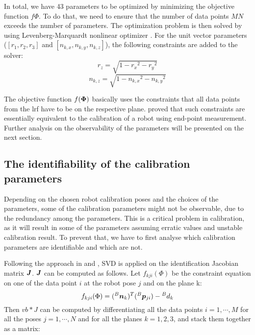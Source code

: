 In total, we have 43 parameters to be optimized by minimizing the objective function $f{\Phi}$. To do that, we need to ensure that the number of data points $MN$ exceeds the number of parameters. The optimization problem is then solved by using Levenberg-Marquardt nonlinear optimizer \cite{Newville2014}. For the unit vector parameters ($[r_1, r_2, r_3]$ and  $[n_{k,x}, n_{k,y}, n_{k,z}]$), the following constraints are added to the solver:
\begin{equation}
\label{eq:10}
{r_z} = \sqrt{1 - {r_x}^2 - {r_y}^2}
\end{equation}
\begin{equation}
\label{eq:11}
n_{k,z} = \sqrt{1 - {n_{k,x}}^2 - {n_{k,y}}^2}
\end{equation}


The objective function $f(\vb*{\Phi})$ basically uses the constraints that all data points from the \ac{lrf} have to be on the respective plane. \cite{Zhuang1999} proved that such constraints are essentially equivalent to the calibration of a robot using end-point measurement. Further analysis on the observability of the parameters will be presented on the next section. 

\subsection{The identifiability of the calibration parameters}
\label{sec:third_step}

Depending on the chosen robot calibration poses and the choices of the parameters, some of the calibration parameters might not be observable, due to the redundancy among the parameters. This is a critical problem in calibration, as it will result in some of the parameters assuming erratic values and unstable calibration result. To prevent that, we have to first analyse which calibration parameters are identifiable and which are not. 

Following the approach in \cite{Hollerbach1996} and \cite{Joubair2015}, SVD is applied on the identification Jacobian matrix $\vb*{J}$. $\vb*{J}$ can be computed as follows. Let  $f_{kji}(\Phi)$ be the constraint equation on one of the data point $i$ at the robot pose $j$ and on the plane k:
\begin{equation}
 f_{kji}(\Phi) =  ({^B}\vb*{n}_k) ^T ({^B}\vb*{p}_{ji}) - {^B}d_k
\end{equation}
Then $vb*{J}$ can be computed by differentiating all the data points $i = 1, \cdots, M$ for all the poses $j = 1, \cdots, N$ and for all the planes $k=1,2,3$, and stack them together as a matrix:

